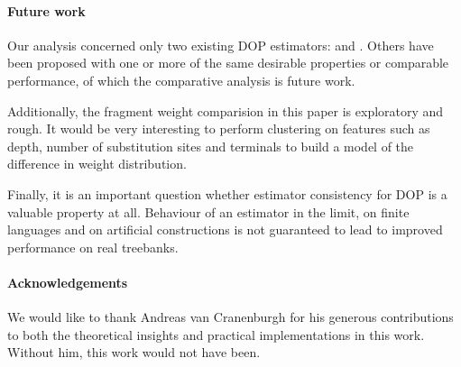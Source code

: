 \paragraph{Future work}
Our analysis concerned only two existing DOP estimators: \ddop{} and \dops{}. Others have been proposed with one or more of the same desirable properties or comparable performance, of which the comparative analysis is future work.

Additionally, the fragment weight comparision in this paper is exploratory and rough. It would be very interesting to perform clustering on features such as depth, number of substitution sites and terminals to build a model of the difference in weight distribution.

Finally, it is an important question whether estimator consistency for DOP is a valuable property at all. Behaviour of an estimator in the limit, on finite languages and on artificial constructions is not guaranteed to lead to improved performance on real treebanks. 

\paragraph{Acknowledgements}
We would like to thank Andreas van Cranenburgh for his generous contributions to both the theoretical insights and practical implementations in this work. Without him, this work would not have been.
